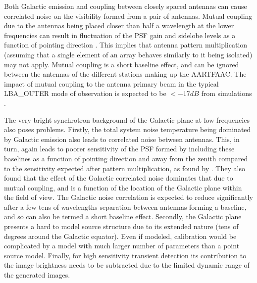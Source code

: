\documentclass{aa}
\begin{document}
Both Galactic  emission and coupling  between closely spaced antennas  can cause
correlated  noise on  the  visibility formed  from  a pair  of antennas.  Mutual
coupling due to  the antennas being placed closer than half  a wavelength at the
lower frequencies can result in fluctuation  of the PSF gain and sidelobe levels
as  a function  of pointing  direction \citep{agrawal1972mutual}.   This implies
that antenna pattern multiplication (assuming  that a single element of an array
behaves similarly  to it being  isolated) may not  apply.  Mutual coupling  is a
short baseline effect, and can be  ignored between the antennas of the different
stations making  up the AARTFAAC. The  impact of mutual coupling  to the antenna
primary beam  in the typical  LBA\_OUTER mode of  observation is expected  to be
$<-17dB$ from simulations \citep{wijnholds2011situ}.

The very bright synchrotron background  of the Galactic plane at low frequencies
also poses problems. Firstly, the total system noise temperature being dominated
by Galactic emission  also leads to correlated noise  between antennas. This, in
turn, again  leads to poorer  sensitivity of the  PSF formed by  including these
baselines as a function of pointing  direction and away from the zenith compared
to  the   sensitivity  expected  after  pattern  multiplication,   as  found  by
\citet{ellingson2011sensitivity}.   They  also  found  that the  effect  of  the
Galactic  correlated noise  dominates  that due  to  mutual coupling,  and is  a
function of  the location of  the Galactic plane  within the field of  view. The
Galactic noise correlation is expected  to reduce significantly after a few tens
of wavelengths separation  between antennas forming a baseline,  and so can also
be termed a short baseline effect.  Secondly, the Galactic plane presents a hard
to model source structure due to its extended nature (tens of degrees around the
Galactic equator).  Even if modeled, calibration would be complicated by a model
with much larger  number of parameters than a point  source model.  Finally, for
high sensitivity  transient detection its  contribution to the  image brightness
needs to be subtracted due to the limited dynamic range of the generated images.
\end{document}
